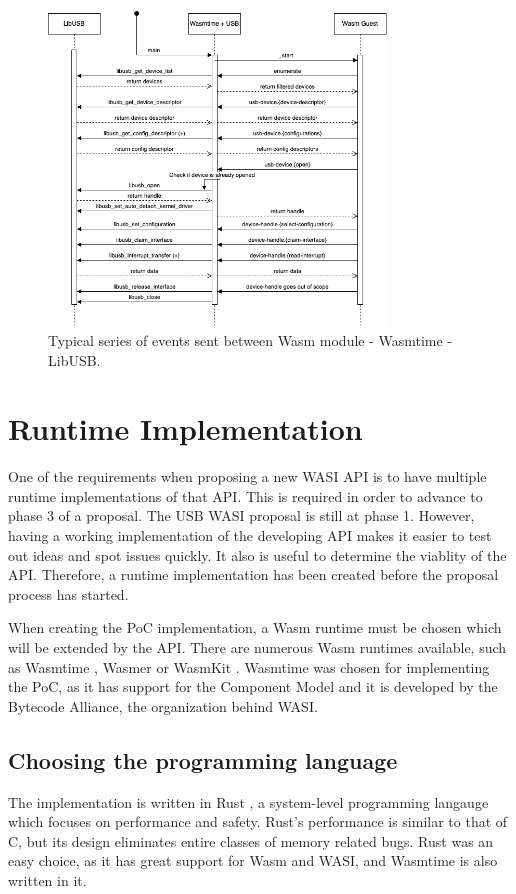 \begin{figure}[h]
  \centering
  \includegraphics[width=0.8\textwidth]{images/sequentiediagram.png}
  \caption{Typical series of events sent between Wasm module - Wasmtime - LibUSB.}
  \label{fig:implementation_overview}
\end{figure}


\section{Runtime Implementation}
One of the requirements when proposing a new \acrshort{WASI} \acrshort{API} is to have multiple runtime implementations of that \acrshort{API}. This is required in order to advance to phase 3 of a proposal. The \acrshort{USB} \acrshort{WASI} proposal is still at phase 1. However, having a working implementation of the developing \acrshort{API} makes it easier to test out ideas and spot issues quickly. It also is useful to determine the viablity of the \acrshort{API}. Therefore, a runtime implementation has been created before the proposal process has started.

When creating the \acrshort{PoC} implementation, a \acrshort{Wasm} runtime must be chosen which will be extended by the \acrshort{API}. There are numerous \acrshort{Wasm} runtimes available, such as Wasmtime \cite{wasmtime_website}, Wasmer \cite{wasmer} or WasmKit \cite{wasmkit}. Wasmtime was chosen for implementing the \acrshort{PoC}, as it has support for the Component Model and it is developed by the Bytecode Alliance, the organization behind \acrshort{WASI}.

\subsection{Choosing the programming language}
The implementation is written in Rust \cite{rust_lang}, a system-level programming langauge which focuses on performance and safety. Rust's performance is similar to that of C, but its design eliminates entire classes of memory related bugs. Rust was an easy choice, as it has great support for \acrshort{Wasm} and \acrshort{WASI}, and Wasmtime is also written in it.

